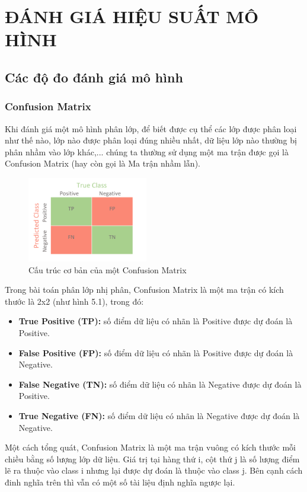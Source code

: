 \documentclass[12pt,a4paper,oneside]{book}
\begin{document}
\chapter{ĐÁNH GIÁ HIỆU SUẤT MÔ HÌNH}
	\section{Các độ đo đánh giá mô hình}
	\subsection{Confusion Matrix}
		Khi đánh giá một mô hình phân lớp, để biết được cụ thể các lớp được phân loại như thế nào, lớp nào được phân loại đúng nhiều nhất, dữ liệu lớp nào thường bị phân nhầm vào lớp khác,... chúng ta thường sử dụng một ma trận được gọi là Confusion Matrix (hay còn gọi là Ma trận nhầm lẫn).
		
		\begin{figure}[H]
		\centering
		\includegraphics[width=0.47\textwidth]{confusionmatrix}
		\caption{Cấu trúc cơ bản của một Confusion Matrix}
		\end{figure}
		
		Trong bài toán phân lớp nhị phân, Confusion Matrix là một ma trận có kích thước là 2x2 (như hình 5.1), trong đó:
		\begin{itemize}
		\item \textbf{True Positive (TP):} số điểm dữ liệu có nhãn là Positive được dự đoán là Positive.
		\item \textbf{False Positive (FP):} số điểm dữ liệu có nhãn là Positive được dự đoán là Negative.
		\item \textbf{False Negative (TN):} số điểm dữ liệu có nhãn là Negative được dự đoán là Positive.
		\item \textbf{True Negative (FN):} số điểm dữ liệu có nhãn là Negative được dự đoán là Negative.
		\end{itemize}
		
		Một cách tổng quát, Confusion Matrix là một ma trận vuông có kích thước mỗi chiều bằng số lượng lớp dữ liệu. Giá trị tại hàng thứ i, cột thứ j là số lượng điểm lẽ ra thuộc vào class i nhưng lại được dự đoán là thuộc vào class j. Bên cạnh cách đinh nghĩa trên thì vẫn có một số tài liệu định nghĩa ngược lại.
		
\end{document}
